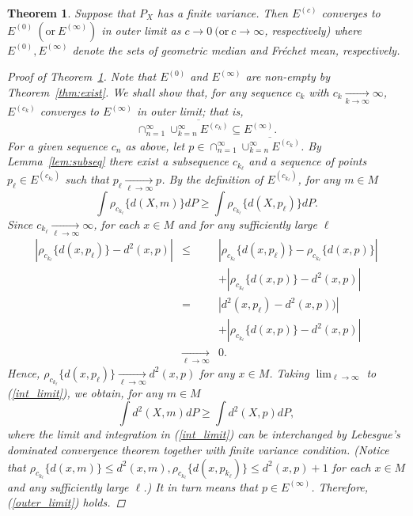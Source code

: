 \documentclass[preprint]{imsart}
\theoremstyle{plain}
\newtheorem{theorem}{Theorem}
\theoremstyle{remark}
\begin{document}
\begin{appendix}
\begin{theorem}\label{thm:set:conv}
Suppose that $P_{X}$ has a finite variance. Then $E^{(c)}$ converges to $E^{(0)} ~ (\mbox{or} ~ E^{(\infty)})$ in outer limit as $c \rightarrow 0 ~ (\mbox{or} ~ c \rightarrow \infty$, respectively) where $E^{(0)}, E^{(\infty)}$ denote the sets of geometric median and Fr\'{e}chet mean, respectively.
\begin{proof}[Proof of Theorem~\ref{thm:set:conv}]
Note that $E^{(0)}$ and $E^{(\infty)}$ are non-empty by Theorem~\ref{thm:exist}. We shall show that, for any sequence $c_{k}$ with $c_{k} \underset{k \rightarrow \infty}{\rightarrow} \infty$, $E^{(c_{k})}$ converges to $E^{(\infty)}$ in outer limit; that is,
 \begin{equation}\label{outer_limit}
 \cap_{n=1}^{\infty} \overline{\cup_{k=n}^{\infty} E^{(c_{k})}} \subseteq E^{(\infty)}.
 \end{equation}
 For a given sequence $c_{n}$ as above, let $p \in \cap_{n=1}^{\infty} \overline{\cup_{k=n}^{\infty} E^{(c_{k})}}$. By Lemma~\ref{lem:subseq} there exist a subsequence $c_{k_\ell}$ and a sequence of points $p_{\ell} \in E^{(c_{k_{\ell}})}$ such that $p_{\ell} \underset{\ell \rightarrow \infty}{\rightarrow} p$. By the definition of $E^{(c_{k_\ell})}$, for any $m \in M$
 \begin{equation}\label{int_limit}
 \int \rho_{c_{k_\ell}}\{d(X, m)\} dP \ge \int \rho_{c_{k_\ell}}\{d(X, p_{\ell})\} dP.
 \end{equation} 
 Since $c_{k_{\ell}} \underset{\ell \rightarrow \infty}{\rightarrow} \infty$, for each $x \in M$ and for any sufficiently large $\ell$ 
 \begin{eqnarray*}
 |\rho_{c_{k_{\ell}}}\{d(x, p_{\ell})\} - d^2(x, p)| 
 &\le& |\rho_{c_{k_{\ell}}}\{d(x, p_{\ell})\} - \rho_{c_{k_{\ell}}}\{d(x, p)\}| \\ 
 & & + |\rho_{c_{k_{\ell}}}\{d(x, p)\} - d^2(x, p)| \\
 &=& |d^2(x, p_{\ell}) - d^2(x, p))| \\
 & & + |\rho_{c_{k_{\ell}}}\{d(x, p)\} - d^2(x, p)| \\
 & \underset{\ell \rightarrow \infty}{\rightarrow}& 0.
 \end{eqnarray*}
 Hence, $\rho_{c_{k_\ell}}\{d(x, p_{\ell})\} \underset{\ell \rightarrow \infty}{\rightarrow} d^2(x, p)$ for any $x \in M$. Taking $\lim_{\ell \rightarrow \infty}$ to (\ref{int_limit}), we obtain, for any $m \in M$
 \[
 \int d^2(X, m) dP \ge \int d^2(X, p) dP,  
 \]
 where the limit and integration in (\ref{int_limit}) can be interchanged by Lebesgue's dominated convergence theorem together with finite variance condition. (Notice that $\rho_{c_{k_{\ell}}}\{d(x, m)\} \le d^2(x, m), \rho_{c_{k_{\ell}}}\{d(x, p_{k_{\ell}})\} \le d^2(x, p) + 1$ for each $x \in M$ and any sufficiently large $\ell$.)
 It in turn means that $p \in E^{(\infty)}$. Therefore, (\ref{outer_limit}) holds.



\end{proof}
\end{theorem}
\end{appendix}
\end{document}
